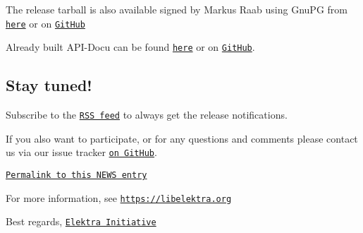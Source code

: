 The release tarball is also available signed by Markus Raab using Gnu\+PG from \href{https://www.libelektra.org/ftp/elektra/releases/elektra-0.8.<<VERSION>>.tar.gz.gpg}{\tt here} or on \href{https://github.com/ElektraInitiative/ftp/blob/master/releases//elektra-0.8.<<VERSION>>.tar.gz.gpg?raw=true}{\tt Git\+Hub}

Already built A\+P\+I-\/\+Docu can be found \href{https://doc.libelektra.org/api/0.8.<<VERSION>>/html/}{\tt here} or on \href{https://github.com/ElektraInitiative/doc/tree/master/api/0.8.<<VERSION>}{\tt Git\+Hub}.

\subsection*{Stay tuned!}

Subscribe to the \href{https://www.libelektra.org/news/feed.rss}{\tt R\+SS feed} to always get the release notifications.

If you also want to participate, or for any questions and comments please contact us via our issue tracker \href{http://issues.libelektra.org}{\tt on Git\+Hub}.

\href{https://www.libelektra.org/news/0.8.<<VERSION>>-release}{\tt Permalink to this N\+E\+WS entry}

For more information, see \href{https://libelektra.org}{\tt https\+://libelektra.\+org}

Best regards, \href{https://www.libelektra.org/developers/authors}{\tt Elektra Initiative} 